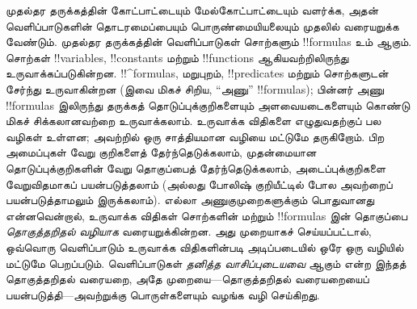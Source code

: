 \documentclass[../../../include/open-logic-section]{subfiles}
\begin{document}


முதல்தர தருக்கத்தின் கோட்பாட்டையும் மேல்கோட்பாட்டையும் வளர்க்க, அதன்
வெளிப்பாடுகளின் தொடரமைப்பையும் பொருண்மையியலையும் முதலில் வரையறுக்க வேண்டும்.
முதல்தர தருக்கத்தின் வெளிப்பாடுகள் சொற்களும் !!{formula}s உம் ஆகும். சொற்கள்
!!{variable}s, !!{constant}s மற்றும் !!{function}s ஆகியவற்றிலிருந்து
உருவாக்கப்படுகின்றன. !!^{formula}s, மறுபுறம், !!{predicate}s மற்றும் சொற்களுடன்
சேர்ந்து உருவாகின்றன (இவை மிகச் சிறிய, ``அணு'' !!{formula}s); பின்னர் அணு
!!{formula}s இலிருந்து தருக்கத் தொடுப்புக்குறிகளையும் அளவையடைகளையும் கொண்டு
மிகச் சிக்கலானவற்றை உருவாக்கலாம். உருவாக்க விதிகளை எழுதுவதற்குப் பல வழிகள்
உள்ளன; அவற்றில் ஒரு சாத்தியமான வழியை மட்டுமே தருகிறோம். பிற அமைப்புகள்
வேறு குறிகளைத் தேர்ந்தெடுக்கலாம், முதன்மையான தொடுப்புக்குறிகளின் வேறு
தொகுப்பைத் தேர்ந்தெடுக்கலாம், அடைப்புக்குறிகளை வேறுவிதமாகப் பயன்படுத்தலாம்
(அல்லது போலிஷ் குறியீட்டில் போல அவற்றைப் பயன்படுத்தாமலும் இருக்கலாம்).
எல்லா அணுகுமுறைகளுக்கும் பொதுவானது என்னவென்றால், உருவாக்க விதிகள் சொற்களின்
மற்றும் !!{formula}s இன் தொகுப்பை \emph{தொகுத்தறிதல் வழியாக} வரையறுக்கின்றன.
அது முறையாகச் செய்யப்பட்டால், ஒவ்வொரு வெளிப்பாடும் உருவாக்க விதிகளின்படி
அடிப்படையில் ஒரே ஒரு வழியில் மட்டுமே பெறப்படும். வெளிப்பாடுகள்
\emph{தனித்த வாசிப்புடையவை} ஆகும் என்ற இந்தத் தொகுத்தறிதல் வரையறை,
அதே முறையை---தொகுத்தறிதல் வரையறையைப் பயன்படுத்தி---அவற்றுக்கு
பொருள்களையும் வழங்க வழி செய்கிறது.
\end{document}
